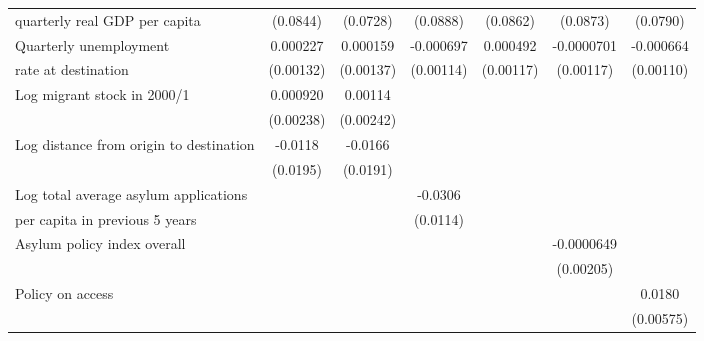 \begin{table}[!ht]
\begin{tabular}{l*{6}{c}}
quarterly real GDP per capita                    &    (0.0844)         &    (0.0728)         &    (0.0888)         &    (0.0862)         &    (0.0873)         &    (0.0790)         \\
[0.5em]
Quarterly unemployment &    0.000227         &    0.000159         &   -0.000697         &    0.000492         &  -0.0000701         &   -0.000664         \\
rate at destination                    &   (0.00132)         &   (0.00137)         &   (0.00114)         &   (0.00117)         &   (0.00117)         &   (0.00110)         \\
[0.5em]
Log migrant stock in 2000/1&    0.000920         &     0.00114         &                     &                     &                     &                     \\
                    &   (0.00238)         &   (0.00242)         &                     &                     &                     &                     \\
[0.5em]
Log distance from origin to destination&     -0.0118         &     -0.0166         &                     &                     &                     &                     \\
                    &    (0.0195)         &    (0.0191)         &                     &                     &                     &                     \\
[0.5em]
Log total average asylum applications &                     &                     &     -0.0306\sym{**} &                     &                     &                     \\
per capita in previous 5 years                    &                     &                     &    (0.0114)         &                     &                     &                     \\
[0.5em]
Asylum policy index overall&                     &                     &                     &                     &  -0.0000649         &                     \\
                    &                     &                     &                     &                     &   (0.00205)         &                     \\
[0.5em]
Policy on access    &                     &                     &                     &                     &                     &      0.0180\sym{**} \\
                    &                     &                     &                     &                     &                     &   (0.00575)         \\

\end{tabular}
\end{table}

